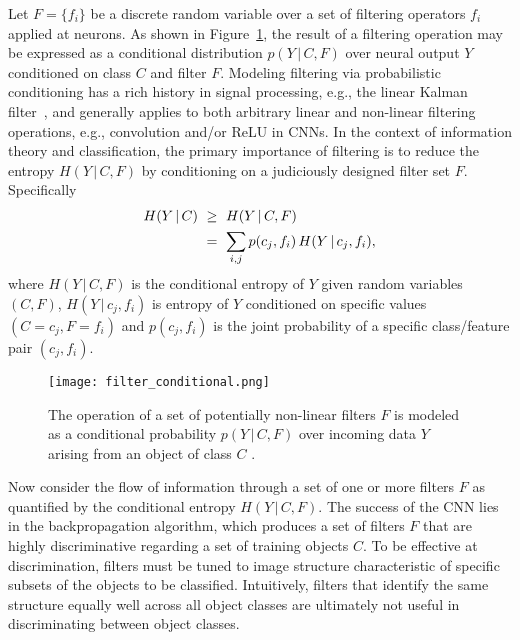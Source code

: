 \documentclass[10pt,onecolumn]{article}
\begin{document}
Let $F=\{f_i\}$ be a discrete random variable over a set of filtering operators $f_i$ applied at neurons. As shown in Figure~\ref{fig:filtering}, the result of a filtering operation may be expressed as a conditional distribution $p(Y\, | \,C,F)$ over neural output $Y$ conditioned on class $C$ and filter $F$. Modeling filtering via probabilistic conditioning has a rich history in signal processing, e.g., the linear Kalman filter~\cite{kalman1960new}, and generally applies to both arbitrary linear and non-linear filtering operations, e.g., convolution and/or ReLU in CNNs. In the context of information theory and classification, the primary importance of filtering is to reduce the entropy $H(Y\, | \,C,F)$ by conditioning on a judiciously designed filter set $F$. Specifically 
\begin{align}
  H(Y\, | \,C) & \ \geq \ H(Y\, | \,C,F) \\ \notag 
     & \ = \ \sum_{i,j} p(c_j,f_i) \, H(Y\, | \,c_j,f_i),
\end{align}
where $H(Y\, | \,C,F)$ is the conditional entropy of $Y$ given random variables $(C,F)$, $H(Y\, | \,c_j,f_i)$ is entropy of $Y$ conditioned on specific values $(C=c_j,F=f_i)$ and $p(c_j,f_i)$ is the joint probability of a specific class/feature pair $(c_j,f_i)$. 

\begin{figure}[t]
\begin{center}
\texttt{[image: filter\_conditional.png]}
\end{center}
   \caption{The operation of a set of potentially non-linear filters $F$ is modeled as a conditional probability $p(Y\, | \,C,F)$ over incoming data $Y$ arising from an object of class $C$ .}
\label{fig:filtering}
\end{figure}

Now consider the flow of information through a set of one or more filters $F$ as quantified by the conditional entropy $H(Y\, | \,C,F)$. The success of the CNN lies in the backpropagation algorithm, which produces a set of filters $F$ that are highly discriminative regarding a set of training objects $C$. To be effective at discrimination, filters must be tuned to image structure characteristic of specific subsets of the objects to be classified. Intuitively, filters that identify the same structure equally well across all object classes are ultimately not useful in discriminating between object classes.
\end{document}
